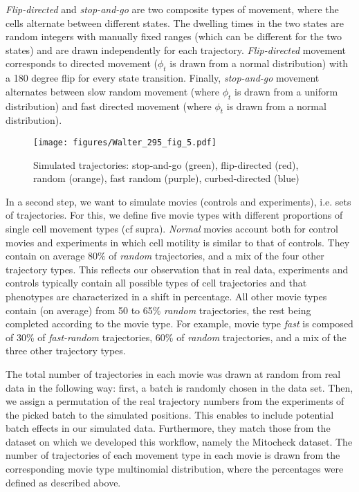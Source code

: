 \textit{Flip-directed} and \textit{stop-and-go} are two composite types of movement, where the cells
alternate between different states. The dwelling times in the two
states are random integers with manually fixed ranges (which can be
different for the two states) and are drawn independently for each
trajectory. \textit{Flip-directed} movement corresponds to directed
movement ($\phi_t$ is drawn from a normal distribution) with a 180
degree flip for every state transition. Finally, \textit{stop-and-go}
movement alternates between slow random movement (where $\phi_t$ is
drawn from a uniform distribution)  and fast directed
movement (where $\phi_t$ is drawn from a normal distribution).  
\begin{figure}[ht]
\centering
\texttt{[image: figures/Walter\_295\_fig\_5.pdf]}
\caption{Simulated trajectories: stop-and-go (green), flip-directed
  (red), random (orange), fast random (purple), curbed-directed (blue)}
\label{simulation}
\end{figure}

In a second step, we want to simulate movies (controls and experiments), i.e. sets of
trajectories. For this, we define five movie types with different
proportions of single cell movement types (cf supra). \textit{Normal}
movies account both for 
control movies and experiments in which cell motility is similar to
that of controls. They contain on average $80\%$ of \textit{random} trajectories,
and a mix of the four other trajectory types. This reflects our
observation that in real data, experiments and controls typically contain all possible types
of cell trajectories and that phenotypes are characterized in a shift
in percentage. All other movie types contain (on average) from 50 to 65\%
\textit{random} trajectories, the rest being completed according to
the movie type. For example, movie type \textit{fast} is composed of 30\% of
\textit{fast-random} trajectories, 60\% of \textit{random}
trajectories, and a mix of the three other trajectory types. 

The total number of trajectories in each movie was drawn at random
from real data in the following way: first, a batch is randomly chosen in the data
set. Then, we assign a permutation of the real trajectory numbers from
the experiments of the picked batch to the simulated positions. This enables to include potential batch effects in our simulated data. Furthermore, they match those from the dataset on which we developed this workflow, namely the Mitocheck dataset. The number of trajectories of each movement type in each movie is drawn from
the corresponding movie type multinomial distribution, where the
percentages were defined as described above. 

